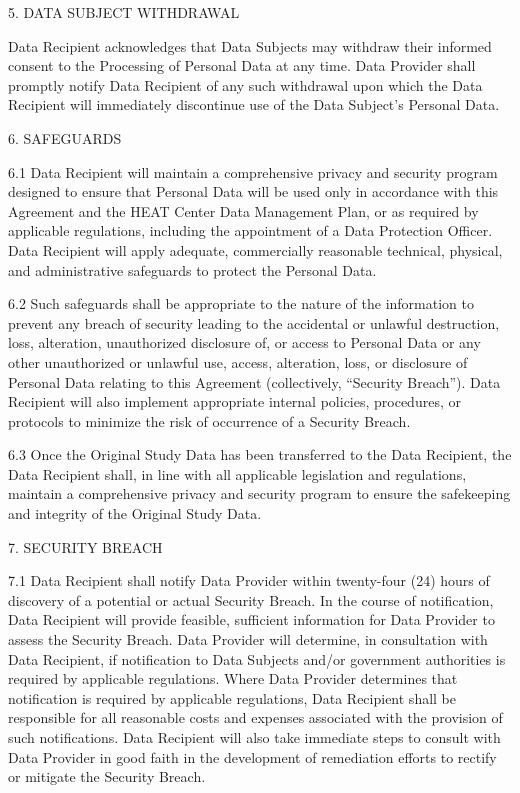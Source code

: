 \documentclass[12pt,letterpaper]{article}
\begin{document}
5.	DATA SUBJECT WITHDRAWAL	

Data Recipient acknowledges that Data Subjects may withdraw their informed consent to the Processing of Personal Data at any time. Data Provider shall promptly notify Data Recipient of any such withdrawal upon which the Data Recipient will immediately discontinue use of the Data Subject’s Personal Data.

6.	SAFEGUARDS	

6.1	Data Recipient will maintain a comprehensive privacy and security program designed to ensure that Personal Data will be used only in accordance with this Agreement and the HEAT Center Data Management Plan, or as required by applicable regulations, including the appointment of a Data Protection Officer. Data Recipient will apply adequate, commercially reasonable technical, physical, and administrative safeguards to protect the Personal Data. 

6.2	Such safeguards shall be appropriate to the nature of the information to prevent any breach of security leading to the accidental or unlawful destruction, loss, alteration, unauthorized disclosure of, or access to Personal Data or any other unauthorized or unlawful use, access, alteration, loss, or disclosure of Personal Data relating to this Agreement (collectively, “Security Breach”). Data Recipient will also implement appropriate internal policies, procedures, or protocols to minimize the risk of occurrence of a Security Breach.

6.3	Once the Original Study Data has been transferred to the Data Recipient, the Data Recipient shall, in line with all applicable legislation and regulations, maintain a comprehensive privacy and security program to ensure the safekeeping and integrity of the Original Study Data.

7.	SECURITY BREACH	

7.1	Data Recipient shall notify Data Provider within twenty-four (24) hours of discovery of a potential or actual Security Breach. In the course of notification, Data Recipient will provide feasible, sufficient information for Data Provider to assess the Security Breach. Data Provider will determine, in consultation with Data Recipient, if notification to Data Subjects and/or government authorities is required by applicable regulations. Where Data Provider determines that notification is required by applicable regulations, Data Recipient shall be responsible for all reasonable costs and expenses associated with the provision of such notifications. Data Recipient will also take immediate steps to consult with Data Provider in good faith in the development of remediation efforts to rectify or mitigate the Security Breach. 
\end{document}
